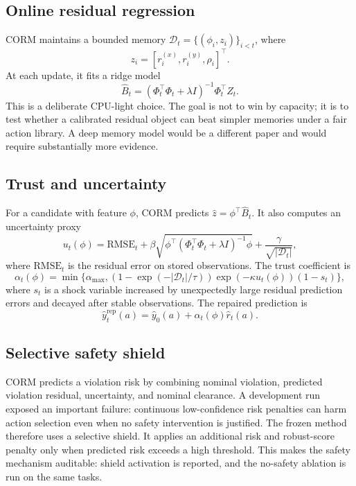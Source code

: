 \documentclass{article}
\begin{document}
\subsection{Online residual regression}

CORM maintains a bounded memory $\mathcal{D}_t=\{(\phi_i,z_i)\}_{i<t}$, where
\begin{equation}
z_i = [r_i^{(x)}, r_i^{(y)}, \rho_i]^\top.
\end{equation}
At each update, it fits a ridge model
\begin{equation}
\hat B_t = (\Phi_t^\top \Phi_t + \lambda I)^{-1}\Phi_t^\top Z_t.
\end{equation}
This is a deliberate CPU-light choice. The goal is not to win by capacity; it is to test whether a calibrated residual object can beat simpler memories under a fair action library. A deep memory model would be a different paper and would require substantially more evidence.

\subsection{Trust and uncertainty}

For a candidate with feature $\phi$, CORM predicts $\hat z=\phi^\top \hat B_t$. It also computes an uncertainty proxy
\begin{equation}
u_t(\phi)=\mathrm{RMSE}_t + \beta \sqrt{\phi^\top(\Phi_t^\top\Phi_t+\lambda I)^{-1}\phi} + \frac{\gamma}{\sqrt{|\mathcal{D}_t|}},
\end{equation}
where $\mathrm{RMSE}_t$ is the residual error on stored observations. The trust coefficient is
\begin{equation}
\alpha_t(\phi)=\min\{\alpha_{\max}, (1-\exp(-|\mathcal{D}_t|/\tau))\exp(-\kappa u_t(\phi))(1-s_t)\},
\end{equation}
where $s_t$ is a shock variable increased by unexpectedly large residual prediction errors and decayed after stable observations. The repaired prediction is
\begin{equation}
\hat y_t^{\mathrm{rep}}(a)=\hat y_0(a)+\alpha_t(\phi)\hat r_t(a).
\end{equation}

\subsection{Selective safety shield}

CORM predicts a violation risk by combining nominal violation, predicted violation residual, uncertainty, and nominal clearance. A development run exposed an important failure: continuous low-confidence risk penalties can harm action selection even when no safety intervention is justified. The frozen method therefore uses a selective shield. It applies an additional risk and robust-score penalty only when predicted risk exceeds a high threshold. This makes the safety mechanism auditable: shield activation is reported, and the no-safety ablation is run on the same tasks.
\end{document}
